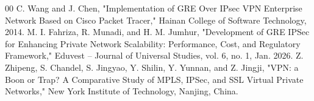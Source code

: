\documentclass[conference]{IEEEtran}
\begin{document}
\begin{thebibliography}{00}
 C. Wang and J. Chen, "Implementation of GRE Over IPsec VPN Enterprise Network Based on Cisco Packet Tracer," Hainan College of Software Technology, 2014.
 M. I. Fahriza, R. Munadi, and H. M. Jumhur, "Development of GRE IPSec for Enhancing Private Network Scalability: Performance, Cost, and Regulatory Framework," Eduvest – Journal of Universal Studies, vol. 6, no. 1, Jan. 2026.
 Z. Zhipeng, S. Chandel, S. Jingyao, Y. Shilin, Y. Yunnan, and Z. Jingji, "VPN: a Boon or Trap? A Comparative Study of MPLS, IPSec, and SSL Virtual Private Networks," New York Institute of Technology, Nanjing, China.
\end{thebibliography}
\end{document}

